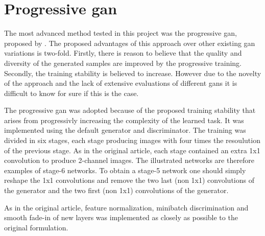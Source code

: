 \section{Progressive \acrshort{gan}}
The most advanced method tested in this project was the progressive \acrshort{gan}, proposed by \textcite{karras2017progressive}. The proposed advantages of this approach over other existing \acrshort{gan} variations is two-fold. Firstly, there is reason to believe that the quality and diversity of the generated samples are improved by the progressive training. Secondly, the training stability is believed to increase. However due to the novelty of the approach and the lack of extensive evaluations of different \acrshort{gans} \todoproofread{,} it is difficult to know for sure if this is the case.

The progressive \acrshort{gan} was adopted because of the proposed training stability that arises from progressivly increasing the complexity of the learned task. It was implemented using the default generator and discriminator. The training was divided in six stages, each stage producing images with four times the resoulution of the previous stage. As in the original article, each stage contained an extra 1x1 convolution to produce 2-channel images.  The illustrated networks are therefore examples of stage-6 networks. To obtain a stage-5 network one should simply reshape the 1x1 convolutions and remove the two last (non 1x1) convolutions of the generator and the two first (non 1x1) convolutions of the generator.

As in the original article, feature normalization, minibatch discrimination and smooth fade-in of new layers was implemented as closely as possible to the original formulation.



